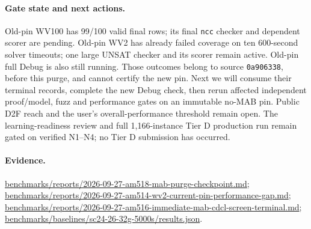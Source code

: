 \documentclass[11pt]{article}
\begin{document}
\paragraph{Gate state and next actions.}
Old-pin WV100 has 99/100 valid final rows; its final \texttt{ncc} checker and
dependent scorer are pending. Old-pin WV2 has already failed coverage on ten
600-second solver timeouts; one large UNSAT checker and its scorer remain
active. Old-pin full Debug is also still running. Those outcomes belong to
source \texttt{0a906338}, before this purge, and cannot certify the new pin.
Next we will consume their terminal records, complete the new Debug check,
then rerun affected independent proof/model, fuzz and performance gates on an
immutable no-MAB pin. Public D2F reach and the user's overall-performance
threshold remain open. The learning-readiness review and full 1,166-instance
Tier D production run remain gated on verified N1--N4; no Tier D submission
has occurred.

\paragraph{Evidence.}
\url{benchmarks/reports/2026-09-27-am518-mab-purge-checkpoint.md};
\url{benchmarks/reports/2026-09-27-am514-wv2-current-pin-performance-gap.md};
\url{benchmarks/reports/2026-09-27-am516-immediate-mab-cdcl-screen-terminal.md};
\url{benchmarks/baselines/sc24-26-32g-5000s/results.json}.
\end{document}
